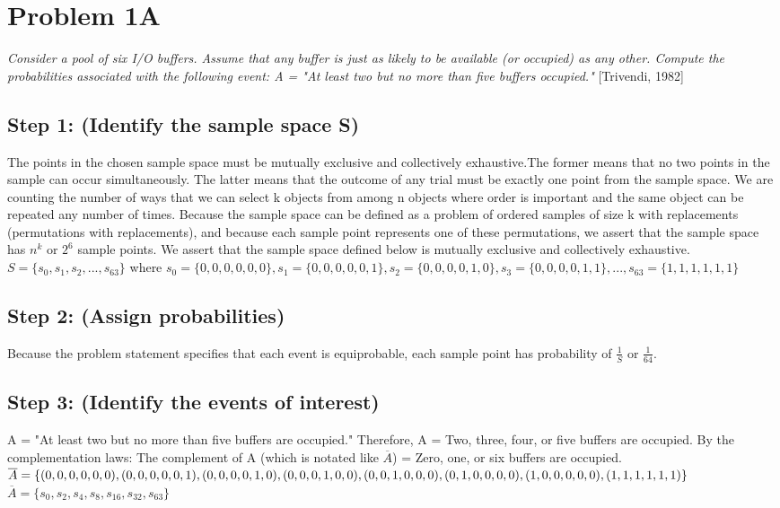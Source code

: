 \documentclass[a4paper,10pt]{article}
\title{}
\author{Mark Johnson \\
Loyola University Chicago}
\date {mjohnson4@luc.edu}
\begin{document}
\maketitle
\section{Problem 1A}
\emph{Consider a pool of six I/O buffers. Assume that any buffer is just as likely to be available (or occupied) as 
any other. Compute the probabilities associated with the following event: \newline
A = "At least two but no more than five buffers occupied."} [Trivendi, 1982]
\subsection{Step 1: (Identify the sample space S)}
The points in the chosen sample space must be mutually exclusive and collectively exhaustive.The former means that no 
two points in the sample can occur simultaneously. The latter means that the outcome of any trial must be exactly one 
point from the sample space. We are counting the number of ways that we can select k objects from among n objects 
where order is important and the same object can be repeated any number of times. Because the sample space can be 
defined as a problem of ordered samples of size k with replacements (permutations with replacements), and because 
each sample point represents one of these permutations, we assert that the sample space has $ n^{k} $ or $ 2^{6} $ 
sample points. We assert that the sample space defined below is mutually exclusive and collectively exhaustive. 
\newline
$ S = \{s_{0}, s_{1}, s_{2},..., s_{63}\} $ where \newline
$ s_{0} = \{0,0,0,0,0,0\}, s_{1} = \{0,0,0,0,0,1\}, s_{2} = \{0,0,0,0,1,0\}, s_{3} = \{0,0,0,0,1,1\},..., s_{63} = 
\{1,1,1,1,1,1\} $
\subsection{Step 2: (Assign probabilities)}
Because the problem statement specifies that each event is equiprobable, each sample point has probability of $ 
\frac{1}{S} $ or $ \frac{1}{64}. $
\subsection{Step 3: (Identify the events of interest)}
A = "At least two but no more than five buffers are occupied." \newline
Therefore, A = Two, three, four, or five buffers are occupied. \newline
By the complementation laws: \newline
The complement of A (which is notated like $ \overline{A} $) = Zero, one, or six buffers are 
occupied. \newline
$ \overline{A} = \{(0,0,0,0,0,0), (0,0,0,0,0,1), (0,0,0,0,1,0), \newline
 (0,0,0,1,0,0), (0,0,1,0,0,0), (0,1,0,0,0,0), (1,0,0,0,0,0), (1,1,1,1,1,1)\} $ \newline
$ \overline{A} = \{s_{0}, s_{2}, s_{4}, s_{8}, s_{16}, s_{32}, s_{63}\} $
\end{document}
